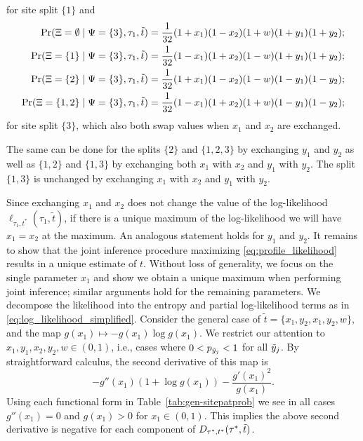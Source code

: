 for site split $\{1\}$ and
\begin{align*}
        \Pr(\Xi=\emptyset \mid \Psi=\{3\}, \tau_1, \tilde{t}) &= \frac{1}{32}(1+x_1)(1-x_2)(1+w)(1+y_1)(1+y_2); \\
    \Pr(\Xi=\{1\} \mid \Psi=\{3\}, \tau_1, \tilde{t}) &= \frac{1}{32}(1-x_1)(1+x_2)(1-w)(1+y_1)(1+y_2); \\
    \Pr(\Xi=\{2\} \mid \Psi=\{3\}, \tau_1, \tilde{t}) &= \frac{1}{32}(1+x_1)(1-x_2)(1-w)(1-y_1)(1-y_2); \\
    \Pr(\Xi=\{1,2\} \mid \Psi=\{3\}, \tau_1, \tilde{t}) &= \frac{1}{32}(1-x_1)(1+x_2)(1+w)(1-y_1)(1-y_2);
\end{align*}
for site split $\{3\}$, which also both swap values when $x_1$ and $x_2$ are exchanged.

The same can be done for the splits $\{2\}$ and $\{1,2,3\}$ by exchanging $y_1$ and $y_2$ as well as $\{1,2\}$ and $\{1,3\}$ by exchanging both $x_1$ with $x_2$ and $y_1$ with $y_2$.
The split $\{1,3\}$ is unchanged by exchanging $x_1$ with $x_2$ and $y_1$ with $y_2$.

Since exchanging $x_1$ and $x_2$ does not change the value of the log-likelihood $\ell_{\tau_1,t^*}(\tau_1, \tilde{t})$, if there is a unique maximum of the log-likelihood we will have $x_1=x_2$ at the maximum.
An analogous statement holds for $y_1$ and $y_2$.
It remains to show that the joint inference procedure maximizing \eqref{eq:profile_likelihood} results in a unique estimate of $t$.
Without loss of generality, we focus on the single parameter $x_1$ and show we obtain a unique maximum when performing joint inference; similar arguments hold for the remaining parameters.
We decompose the likelihood into the entropy and partial log-likelihood terms as in \eqref{eq:log_likelihood_simplified}.
Consider the general case of $\tilde{t}=\{x_1, y_2, x_1, y_2, w\}$, and the map $g(x_1) \mapsto -g(x_1)\log g(x_1)$.
We restrict our attention to $x_1,y_1,x_2,y_2,w\in(0,1)$, i.e., cases where $0<p_{\tilde{y}_j}<1$ for all $\tilde{y}_j$.
By straightforward calculus, the second derivative of this map is
\[
-g''(x_1)(1+\log g(x_1)) - \frac{g'(x_1)^2}{g(x_1)}.
\]
Using each functional form in Table~\ref{tab:gen-sitepatprob} we see in all cases $g''(x_1)=0$ and $g(x_1) > 0$ for $x_1\in(0,1).$
This implies the above second derivative is negative for each component of $D_{\tau^*,t^*}(\tau^*,\tilde{t})$.

